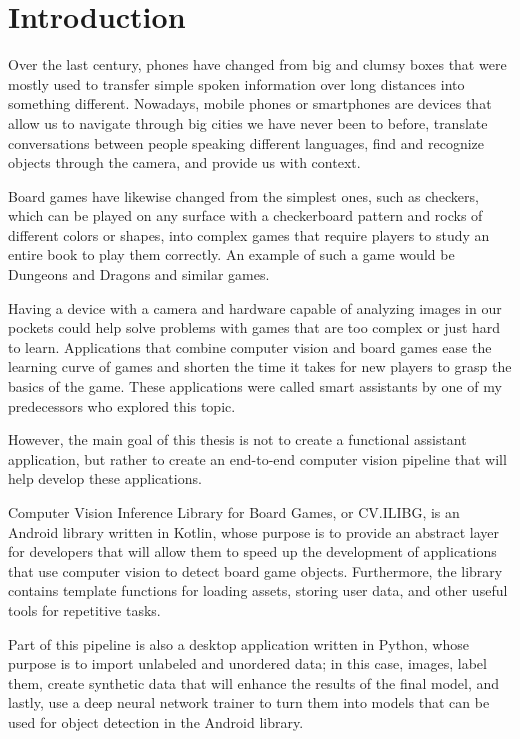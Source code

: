 \chapter{Introduction}
Over the last century, phones have changed from big and clumsy boxes that were mostly used to transfer simple spoken information over long distances into something different. Nowadays, mobile phones or smartphones are devices that allow us to navigate through big cities we have never been to before, translate conversations between people speaking different languages, find and recognize objects through the camera, and provide us with context.

Board games have likewise changed from the simplest ones, such as checkers, which can be played on any surface with a checkerboard pattern and rocks of different colors or shapes, into complex games that require players to study an entire book to play them correctly. An example of such a game would be Dungeons and Dragons and similar games. 

Having a device with a camera and hardware capable of analyzing images in our pockets could help solve problems with games that are too complex or just hard to learn. Applications that combine computer vision and board games ease the learning curve of games and shorten the time it takes for new players to grasp the basics of the game. These applications were called smart assistants by one of my predecessors who explored this topic. 

However, the main goal of this thesis is not to create a functional assistant application, but rather to create an end-to-end computer vision pipeline that will help develop these applications.

Computer Vision Inference Library for Board Games, or CV.ILIBG, is an Android library written in Kotlin, whose purpose is to provide an abstract layer for developers that will allow them to speed up the development of applications that use computer vision to detect board game objects. Furthermore, the library contains template functions for loading assets, storing user data, and other useful tools for repetitive tasks.

Part of this pipeline is also a desktop application written in Python, whose purpose is to import unlabeled and unordered data; in this case, images, label them, create synthetic data that will enhance the results of the final model, and lastly, use a deep neural network trainer to turn them into models that can be used for object detection in the Android library.


